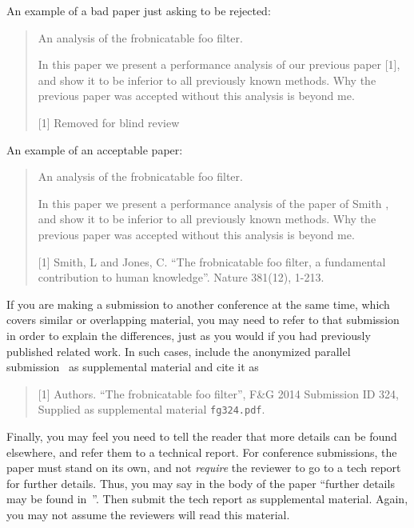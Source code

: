 \documentclass[10pt,twocolumn,letterpaper]{article}
\begin{document}
An example of a bad paper just asking to be rejected:
\begin{quote}
\begin{center}
    An analysis of the frobnicatable foo filter.
\end{center}

   In this paper we present a performance analysis of our previous paper [1], and show it to be inferior to all previously known methods.
   Why the previous paper was accepted without this analysis is beyond me.

   [1] Removed for blind review
\end{quote}


An example of an acceptable paper:
\begin{quote}
\begin{center}
     An analysis of the frobnicatable foo filter.
\end{center}

   In this paper we present a performance analysis of the  paper of Smith \etal [1], and show it to be inferior to all previously known methods.
   Why the previous paper was accepted without this analysis is beyond me.

   [1] Smith, L and Jones, C. ``The frobnicatable foo filter, a fundamental contribution to human knowledge''. Nature 381(12), 1-213.
\end{quote}

If you are making a submission to another conference at the same time, which covers similar or overlapping material, you may need to refer to that submission in order to explain the differences, just as you would if you had previously published related work.
In such cases, include the anonymized parallel submission~ as supplemental material and cite it as
\begin{quote}
[1] Authors. ``The frobnicatable foo filter'', F\&G 2014 Submission ID 324, Supplied as supplemental material {\tt fg324.pdf}.
\end{quote}

Finally, you may feel you need to tell the reader that more details can be found elsewhere, and refer them to a technical report.
For conference submissions, the paper must stand on its own, and not {\em require} the reviewer to go to a tech report for further details.
Thus, you may say in the body of the paper ``further details may be found in~''.
Then submit the tech report as supplemental material.
Again, you may not assume the reviewers will read this material.
\end{document}
